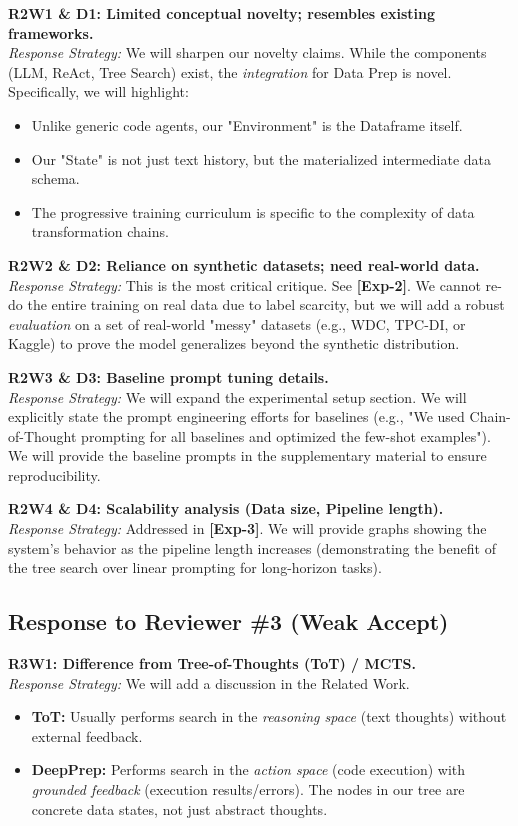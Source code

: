 \noindent \textbf{R2W1 \& D1: Limited conceptual novelty; resembles existing frameworks.} \\
\textit{Response Strategy:} We will sharpen our novelty claims. While the components (LLM, ReAct, Tree Search) exist, the \textit{integration} for Data Prep is novel. Specifically, we will highlight:
\begin{itemize}
    \item Unlike generic code agents, our "Environment" is the Dataframe itself.
    \item Our "State" is not just text history, but the materialized intermediate data schema.
    \item The progressive training curriculum is specific to the complexity of data transformation chains.
\end{itemize}

\noindent \textbf{R2W2 \& D2: Reliance on synthetic datasets; need real-world data.} \\
\textit{Response Strategy:} This is the most critical critique. See \textbf{[Exp-2]}. We cannot re-do the entire training on real data due to label scarcity, but we will add a robust \textit{evaluation} on a set of real-world "messy" datasets (e.g., WDC, TPC-DI, or Kaggle) to prove the model generalizes beyond the synthetic distribution.

\noindent \textbf{R2W3 \& D3: Baseline prompt tuning details.} \\
\textit{Response Strategy:} We will expand the experimental setup section. We will explicitly state the prompt engineering efforts for baselines (e.g., "We used Chain-of-Thought prompting for all baselines and optimized the few-shot examples"). We will provide the baseline prompts in the supplementary material to ensure reproducibility.

\noindent \textbf{R2W4 \& D4: Scalability analysis (Data size, Pipeline length).} \\
\textit{Response Strategy:} Addressed in \textbf{[Exp-3]}. We will provide graphs showing the system's behavior as the pipeline length increases (demonstrating the benefit of the tree search over linear prompting for long-horizon tasks).

\subsection*{Response to Reviewer \#3 (Weak Accept)}

\noindent \textbf{R3W1: Difference from Tree-of-Thoughts (ToT) / MCTS.} \\
\textit{Response Strategy:} We will add a discussion in the Related Work.
\begin{itemize}
    \item \textbf{ToT:} Usually performs search in the \textit{reasoning space} (text thoughts) without external feedback.
    \item \textbf{DeepPrep:} Performs search in the \textit{action space} (code execution) with \textit{grounded feedback} (execution results/errors). The nodes in our tree are concrete data states, not just abstract thoughts.
\end{itemize}

